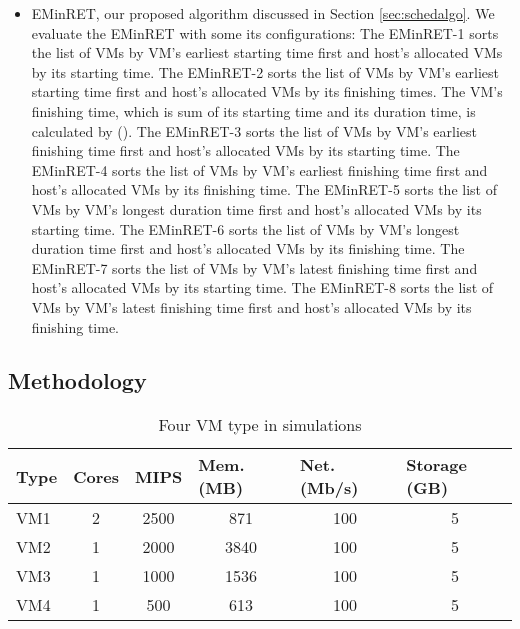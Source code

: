 \begin{itemize}
\item
EMinRET, our proposed algorithm discussed in Section \ref{sec:schedalgo}. We evaluate the EMinRET with some its configurations:
 The EMinRET-1 sorts the list of VMs by VM's earliest starting time first and host's allocated VMs by its starting time.
 The EMinRET-2 sorts the list of VMs by VM's earliest starting time first and host's allocated VMs by its finishing times.
 The VM's finishing time, which is sum of its starting time and its duration time, is calculated by ().
 The EMinRET-3 sorts the list of VMs by VM's earliest finishing time first and host's allocated VMs by its starting time.
 The EMinRET-4 sorts the list of VMs by VM's earliest finishing time first and host's allocated VMs by its finishing time.
 The EMinRET-5 sorts the list of VMs by VM's longest duration time first and host's allocated VMs by its starting time.
 The EMinRET-6 sorts the list of VMs by VM's longest duration time first and host's allocated VMs by its finishing time.
 The EMinRET-7 sorts the list of VMs by VM's latest finishing time first and host's allocated VMs by its starting time.
 The EMinRET-8 sorts the list of VMs by VM's latest finishing time first and host's allocated VMs by its finishing time.


\end{itemize}

\subsection{Methodology}

\begin{table}[htp]
\caption{Four VM type in simulations}
\label{tab:vmtype}
\centering

\begin{tabular}{|l|c|c|c|c|c|}
\hline
Type                    & \multicolumn{1}{l|}{Cores} & \multicolumn{1}{l|}{MIPS} & \multicolumn{1}{l|}{Mem. (MB)} & \multicolumn{1}{l|}{Net. (Mb/s)} & \multicolumn{1}{l|}{Storage (GB)} \\ \hline
VM1                     & 2                              & 2500                     & 871                             & 100                             & 5                             \\
VM2	 					& 1                              & 2000                     & 3840                            & 100                             & 5                             \\
VM3                     & 1                              & 1000                     & 1536                            & 100                             & 5                             \\
VM4                     & 1                              & 500                       & 613                             & 100                             & 5                             \\ \hline
\end{tabular}
\end{table}
 
